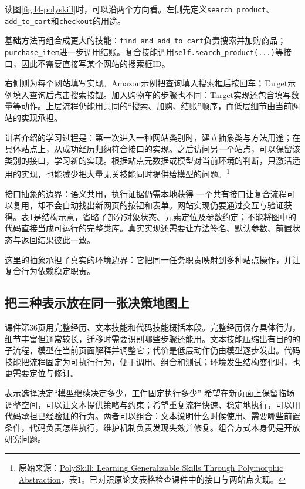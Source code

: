 \documentclass[11pt,a4paper]{article}
\begin{document}
读图\ref{fig:l4-polyskill}时，可以沿两个方向看。左侧先定义\texttt{search\_product}、\texttt{add\_to\_cart}和\texttt{checkout}的用途。

基础方法再组合成更大的技能：\texttt{find\_and\_add\_to\_cart}负责搜索并加购商品；\texttt{purchase\_item}进一步调用结账。复合技能调用\texttt{self.search\_product(...)}等接口，因此不需要直接写某个网站的搜索框ID。

右侧则为每个网站填写实现。Amazon示例把查询填入搜索框后按回车；Target示例填入查询后点击搜索按钮。加入购物车的步骤也不同：Target实现还包含填写数量等动作。上层流程仍能用共同的“搜索、加购、结账”顺序，而低层细节由当前网站的实现承担。

讲者介绍的学习过程是：第一次进入一种网站类别时，建立抽象类与方法用途；在具体站点上，从成功经历归纳符合接口的实现。之后访问另一个站点，可以保留该类别的接口，学习新的实现。根据站点元数据或模型对当前环境的判断，只激活适用的实现，也能减少把大量无关技能同时提供给模型的问题。\footnote{原始来源：\href{https://arxiv.org/pdf/2510.15863}{PolySkill: Learning Generalizable Skills Through Polymorphic Abstraction}，表1。已对照原论文表格检查课件中的接口与两站点实现。}

\begin{knowledgebox}{接口抽象的边界：语义共用，执行证据仍需本地获得}
一个共有接口让复合流程可以复用，却不会自动找出新网页的按钮和表单。网站实现仍要通过交互与验证获得。表1是结构示意，省略了部分对象状态、元素定位及参数约定；不能将图中的代码直接当成可运行的完整类库。真实实现还需要让方法签名、默认参数、前置状态与返回结果彼此一致。
\end{knowledgebox}

这里的抽象承担了真实的环境边界：它把同一任务职责映射到多种站点操作，并让复合行为依赖稳定职责。

\subsection{把三种表示放在同一张决策地图上}
课件第36页用完整经历、文本技能和代码技能概括本段。完整经历保存具体行为，细节丰富但通常较长，迁移时需要识别哪些步骤还能用。文本技能压缩出有目的的子流程，模型在当前页面解释并调整它；代价是低层动作仍由模型逐步发出。代码技能把流程固定为可执行行为，便于调用、组合和测试；环境发生结构变化时，也更需要定位与修订。

\begin{importantbox}{表示选择决定“模型继续决定多少，工件固定执行多少”}
希望在新页面上保留临场调整空间，可以让文本提供策略与约束；希望重复流程快速、稳定地执行，可以用代码承担已经验证的行为。两者可以组合：文本说明什么时候使用、需要哪些前置条件，代码负责怎样执行，维护机制负责发现失效并修复。组合方式本身仍是开放研究问题。
\end{importantbox}
\end{document}

